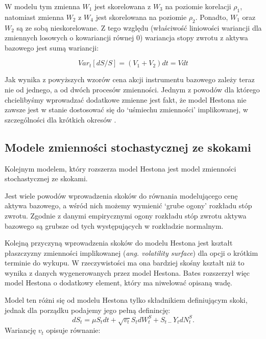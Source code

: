\documentclass{pracamgr}
\begin{document}
W modelu tym zmienna $W_1$ jest skorelowana z $W_3$ na poziomie korelacji $\rho_1$, natomiast
zmienna $W_2$ z $W_4$ jest skorelowana na poziomie $\rho_2$. Ponadto, $W_1$ oraz $W_2$ są ze sobą 
nieskorelowane. Z tego względu (właściwość
liniowości wariancji dla zmiennych losowych o kowariancji równej $0$) wariancja stopy zwrotu z aktywa
bazowego jest sumą wariancji:

\begin{equation}
  Var_t[dS/S] = (V_1 + V_2)dt = Vdt
\end{equation}

Jak wynika z powyższych wzorów cena akcji instrumentu bazowego zależy teraz nie od jednego, a od 
dwóch procesów zmienności.
Jednym z powodów dla którego chcielibyśmy wprowadzać dodatkowe zmienne jest fakt, że model
Hestona nie zawsze jest w stanie dostosować się do `uśmiechu zmienności'  implikowanej, w 
szczególności dla krótkich okresów  \cite{HestonExtensions}.


\subsection{Modele zmienności stochastycznej ze skokami} %
\label{sec:modele_zmienno_ci_stochastycznej_ze_skokami}
 
Kolejnym modelem, który rozszerza model Hestona jest model zmienności stochastycznej ze skokami.

Jest wiele powodów wprowadzenia skoków do równania modelującego cenę aktywa bazowego, a wśród nich 
możemy wymienić `grube ogony' rozkładu stóp zwrotu. Zgodnie z danymi empirycznymi ogony rozkładu stóp 
zwrotu aktywa bazowego są grubsze od tych występujących w rozkładzie normalnym.

Kolejną przyczyną wprowadzenia skoków do modelu Hestona jest kształt płaszczyzny zmienności implikowanej
(\textit{ang. volatility surface}) dla opcji o krótkim terminie do wykupu. W rzeczywistości ma ona 
bardziej skośny kształt niż to wynika z danych wygenerowanych przez model Hestona. 
Bates \cite{Bates} rozszerzył więc model Hestona o dodatkowy element, który ma niwelować opisaną wadę.

Model ten różni się od modelu Hestona tylko składnikiem definiującym skoki, jednak dla
porządku podajemy jego pełną definincję:
\begin{equation}
dS_t  = \mu S_t dt + \sqrt{v_t} S_t dW^S_t + S_{t-} Y_t dN_t^S.
\end{equation}
Wariancję $v_t$ opisuje równanie: 
\end{document}
